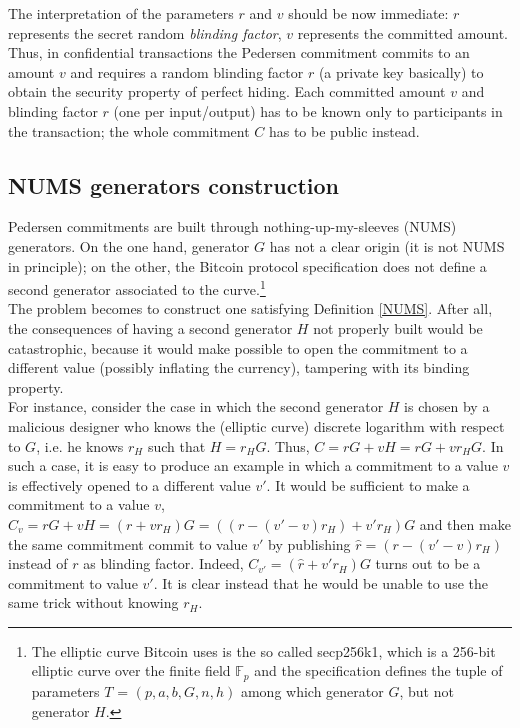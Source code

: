 The interpretation of the parameters $r$ and $v$ should be now immediate: $r$ represents the secret random \textit{blinding factor}, $v$ represents the committed amount. Thus, in confidential transactions the Pedersen commitment commits to an amount $v$ and requires a random blinding factor $r$ (a private key basically) to obtain the security property of perfect hiding. Each committed amount $v$ and blinding factor $r$ (one per input/output) has to be known only to participants in the transaction; the whole commitment $C$ has to be public instead.

\subsection{NUMS generators construction}
Pedersen commitments are built through nothing-up-my-sleeves (NUMS) generators. On the one hand, generator $G$ has not a clear origin (it is not NUMS in principle); on the other, the Bitcoin protocol specification does not define a second generator associated to the curve.\footnote{The elliptic curve Bitcoin uses is the so called secp256k1, which is a 256-bit elliptic curve over the finite field $\mathbb{F}_p$ and the specification defines the tuple of parameters $T$ = $(p, a, b, G, n, h)$ among which generator $G$, but not generator $H$.}\\
The problem becomes to construct one satisfying Definition \ref{NUMS}. After all, the consequences of having a second generator $H$ not properly built would be catastrophic, because it would make possible to open the commitment to a different value (possibly inflating the currency), tampering with its binding property.\\
For instance, consider the case in which the second generator $H$ is chosen by a malicious designer who knows the (elliptic curve) discrete logarithm with respect to $G$, i.e. he knows $r_H$ such that $H = r_HG$. Thus, $C = rG + vH = rG + vr_HG$. In such a case, it is easy to produce an example in which a commitment to a value $v$ is effectively opened to a different value $v'$. It would be sufficient to make a commitment to a value $v$, $C_v = rG + vH = (r + vr_H)G = ((r - (v'-v)r_H) + v'r_H)G$ and then make the same commitment commit to value $v'$ by publishing $\hat{r} = (r - (v'-v)r_H)$ instead of $r$ as blinding factor. Indeed, $C_{v'} = (\hat{r} + v'r_H)G$ turns out to be a commitment to value $v'$. It is clear instead that he would be unable to use the same trick without knowing $r_H$.\\
